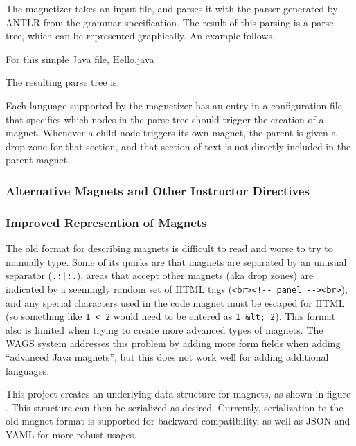 \documentclass[letter,10pt]{article}
\begin{document}
The magnetizer  takes an input 
file, and parses it with the parser generated by ANTLR from the grammar 
specification. The result of this parsing is a parse tree, which can 
be represented graphically. An example follows.

For this simple Java file, Hello.java

The resulting parse tree is:

\label{fig:parseTree}

Each language supported by the magnetizer has an entry in a 
configuration file that specifies which nodes in the parse tree should 
trigger the creation of a magnet. Whenever a child node triggers its 
own magnet, the parent is given a drop zone for that section, and that 
section of text is not directly included in the parent magnet.


\subsubsection{Alternative Magnets and Other Instructor Directives}

\subsubsection{Improved Represention of Magnets}

The old format for describing magnets is difficult to read and worse to 
try to manually type. Some of its quirks are that magnets are separated 
by an unusual separator (\verb~.:|:.~), areas that accept other magnets 
(aka drop zones) are indicated by a seemingly random set of HTML tags 
(\verb~<br><!-- panel --><br>~), and any special characters used in the 
code magnet must be escaped for HTML (so something like \verb~1 < 2~ 
would need to be entered as \verb~1 &lt; 2~). This format also is 
limited when trying to create more advanced types of magnets. The WAGS 
system addresses this problem by adding more form fields when adding 
``advanced Java magnets'', but this does not work well for adding 
additional languages.


This project creates an underlying data structure for magnets, as 
shown in figure . This structure can 
then be serialized as desired. Currently, serialization to the old 
magnet format is supported for backward compatibility, as well as JSON 
and YAML for more robust usages.
\end{document}
